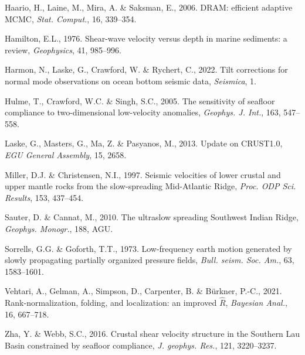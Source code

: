 \documentclass[10pt,a4paper,twocolumn]{article}
\begin{document}
\begin{description}
\item Haario, H., Laine, M., Mira, A. \& Saksman, E., 2006. DRAM: efficient adaptive MCMC, \textit{Stat. Comput.}, 16, 339--354.
\item Hamilton, E.L., 1976. Shear-wave velocity versus depth in marine sediments: a review, \textit{Geophysics}, 41, 985--996.
\item Harmon, N., Laske, G., Crawford, W. \& Rychert, C., 2022. Tilt corrections for normal mode observations on ocean bottom seismic data, \textit{Seismica}, 1.
\item Hulme, T., Crawford, W.C. \& Singh, S.C., 2005. The sensitivity of seafloor compliance to two-dimensional low-velocity anomalies, \textit{Geophys. J. Int.}, 163, 547--558.
\item Laske, G., Masters, G., Ma, Z. \& Pasyanos, M., 2013. Update on CRUST1.0, \textit{EGU General Assembly}, 15, 2658.
\item Miller, D.J. \& Christensen, N.I., 1997. Seismic velocities of lower crustal and upper mantle rocks from the slow-spreading Mid-Atlantic Ridge, \textit{Proc. ODP Sci. Results}, 153, 437--454.
\item Sauter, D. \& Cannat, M., 2010. The ultraslow spreading Southwest Indian Ridge, \textit{Geophys. Monogr.}, 188, AGU.
\item Sorrells, G.G. \& Goforth, T.T., 1973. Low-frequency earth motion generated by slowly propagating partially organized pressure fields, \textit{Bull. seism. Soc. Am.}, 63, 1583--1601.
\item Vehtari, A., Gelman, A., Simpson, D., Carpenter, B. \& B\"urkner, P.-C., 2021. Rank-normalization, folding, and localization: an improved $\hat R$, \textit{Bayesian Anal.}, 16, 667--718.
\item Zha, Y. \& Webb, S.C., 2016. Crustal shear velocity structure in the Southern Lau Basin constrained by seafloor compliance, \textit{J. geophys. Res.}, 121, 3220--3237.
\end{description}
\end{document}
